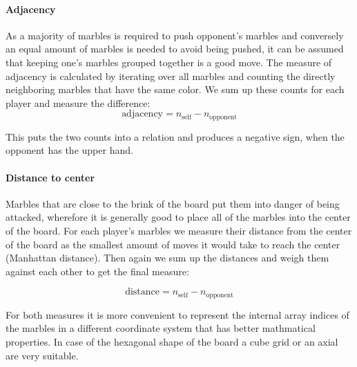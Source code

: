 \documentclass{llncs}
\begin{document}
\paragraph{Adjacency}
As a majority of marbles is required to push opponent's marbles and conversely an equal amount of marbles is needed to avoid being pushed, it can be assumed that keeping one's marbles grouped together is a good move. The measure of adjacency is calculated by iterating over all marbles and counting the directly neighboring marbles that have the same color. We sum up these counts for each player and measure the difference:
$$ \text{adjacency} = n_{\text{self}} - n_{\text{opponent}} $$

This puts the two counts into a relation and produces a negative sign, when the opponent has the upper hand.


\paragraph{Distance to center}
Marbles that are close to the brink of the board put them into danger of being attacked, wherefore it is generally good to place all of the marbles into the center of the board. For each player's marbles we measure their distance from the center of the board as the smallest amount of moves it would take to reach the center (Manhattan distance). Then again we sum up the distances and weigh them against each other to get the final measure:

$$ \text{distance} = n_{\text{self}} - n_{\text{opponent}} $$

For both measures it is more convenient to represent the internal array indices of the marbles in a different coordinate system that has better mathmatical properties. In case of the hexagonal shape of the board a cube grid or an axial are very suitable.
\end{document}
